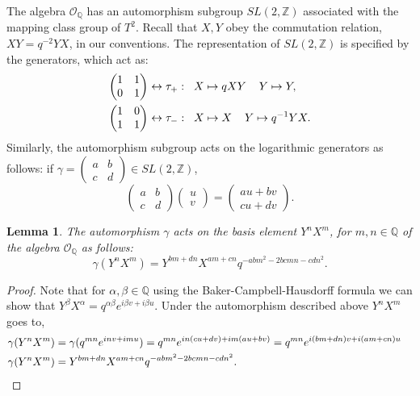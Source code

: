\documentclass{article}
\newcommand{\Z}{{\mathbb Z}}
\newcommand{\Q}{{\mathbb Q}}
\def\be{\begin{equation}}
\def\ee{\end{equation}}
\newtheorem{lemma}[theorem]{Lemma}
\numberwithin{corollary}{theorem}
\numberwithin{corollary}{proposition}
\begin{document}
The algebra $\mathcal{O}_{\Q}$ has an automorphism subgroup $SL(2,\Z)$ associated with the mapping class group of $T^{2}$.
Recall that $X,Y$ obey the commutation relation, $XY=q^{-2}YX$, in our conventions. The representation of $SL(2,\mathbb{Z})$ is specified by the generators, which act as:
\begin{align}
  \begin{pmatrix}
1 & 1 \\
0 & 1 
\end{pmatrix} & \leftrightarrow \tau_{+}: \hspace{2mm} X \mapsto q X Y \hspace{4mm} Y\mapsto Y ,  \\
\begin{pmatrix}
1 & 0 \\
1 & 1 
\end{pmatrix} &\leftrightarrow \tau_{-}: \hspace{2mm} X \mapsto X \hspace{4mm} Y\mapsto q^{-1} Y X .
\end{align}
Similarly, the automorphism subgroup acts on the logarithmic generators as follows: if $\gamma = \begin{pmatrix} a & b \\ c & d  \end{pmatrix} \in SL(2,\Z)$,
\be 
\begin{pmatrix} a & b \\ c & d  \end{pmatrix} \begin{pmatrix}
    u \\ v
\end{pmatrix} = \begin{pmatrix}
    a u + b v \\ c u + d v
\end{pmatrix}.
\ee 
\begin{lemma}\label{prlemma}
The automorphism $\gamma$ acts on the basis element $Y^n X^m$, for $m,n \in \Q$ of the algebra $\mathcal{O}_{\Q}$ as follows:
\be 
\gamma (Y^n X^m) = Y^{b m+ d n} X^{a m+ c n} q^{- a b m^{2}- 2 b c m n - c d n^{2}}.
\ee 
\end{lemma}
\begin{proof}
Note that for $\alpha, \beta \in \Q$ using the Baker-Campbell-Hausdorff formula we can show that $Y^{\beta} X^{\alpha} = q^{\alpha \beta} e^{i \beta v + i \beta u}$. Under the automorphism described above $Y^n X^m$ goes to, 
\begin{align}
    \gamma(Y^n X^m) &=\gamma( q^{m n}e^{ i n v+ i m u}) = q^{m n} e^{ i n ( c u + d v)+ i m(a u+ b v)} =q^{m n} e^{ i(b m + d n)v+ i( a m + c n) u}  \endline \gamma(Y^n X^m) &= Y^{b m+ d n} X^{a m+ c n} q^{- a b m^{2}- 2 b c m n - c d n^{2}}. 
\end{align} 
\end{proof}
\end{document}
